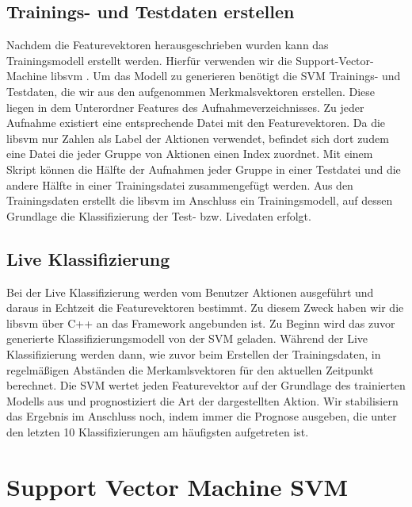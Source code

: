 \subsection{Trainings- und Testdaten erstellen}
Nachdem die Featurevektoren herausgeschrieben wurden kann das Trainingsmodell erstellt werden. Hierfür verwenden wir die Support-Vector-Machine libsvm \cite{libsvm}. Um das Modell zu generieren benötigt die SVM Trainings- und Testdaten, die wir aus den aufgenommen Merkmalsvektoren erstellen. Diese liegen in dem Unterordner \glqq{}Features\grqq{} des Aufnahmeverzeichnisses. Zu jeder Aufnahme existiert eine entsprechende Datei mit den Featurevektoren. Da die libsvm nur Zahlen als Label der Aktionen verwendet, befindet sich dort zudem eine Datei die jeder Gruppe von Aktionen einen Index zuordnet. Mit einem Skript können die Hälfte der Aufnahmen jeder Gruppe in einer Testdatei und die andere Hälfte in einer Trainingsdatei zusammengefügt werden. Aus den Trainingsdaten erstellt die libsvm im Anschluss ein Trainingsmodell, auf dessen Grundlage die Klassifizierung der Test- bzw. Livedaten erfolgt.

\subsection{Live Klassifizierung}
Bei der Live Klassifizierung werden vom Benutzer Aktionen ausgeführt und daraus in Echtzeit die Featurevektoren bestimmt. Zu diesem Zweck haben wir die libsvm über C++ an das Framework angebunden ist. Zu Beginn wird das zuvor generierte Klassifizierungsmodell von der SVM geladen. Während der Live Klassifizierung werden dann, wie zuvor beim Erstellen der Trainingsdaten, in regelmäßigen Abständen die Merkamlsvektoren für den aktuellen Zeitpunkt berechnet. Die SVM wertet jeden Featurevektor auf der Grundlage des trainierten Modells aus und prognostiziert die Art der dargestellten Aktion. Wir stabilisiern das Ergebnis im Anschluss noch, indem immer die Prognose ausgeben, die unter den letzten 10 Klassifizierungen am häufigsten aufgetreten ist. 


\section{Support Vector Machine SVM}

